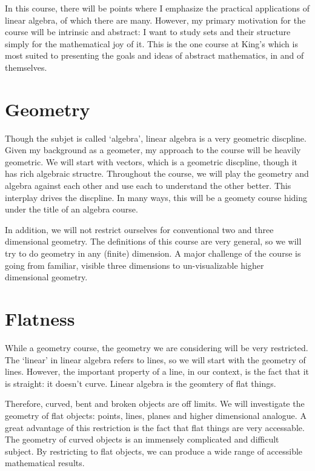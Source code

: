 \documentclass[fleqn]{report}
\begin{document}
In this course, there will be points where I emphasize the
practical applications of linear algebra, of which there are
many. However, my primary motivation for the course will be
intrinsic and abstract: I want to study sets and their
structure simply for the mathematical joy of it. This is the
one course at King's which is most suited to presenting the
goals and ideas of abstract mathematics, in and of themselves. 

\section{Geometry}

Though the subjet is called `algebra', linear algebra is a
very geometric discpline. Given my background as a geometer,
my approach to the course will be heavily geometric. We
will start with vectors, which is a geometric discpline,
though it has rich algebraic structre. Throughout the course,
we will play the geometry and algebra against each other and
use each to understand the other better. This interplay drives
the discpline. In many ways, this will be a geomety course
hiding under the title of an algebra course.

In addition, we will not restrict ourselves for conventional
two and three dimensional geometry. The definitions of this
course are very general, so we will try to do geometry in any
(finite) dimension. A major challenge of the course is going
from familiar, visible three dimensions to un-visualizable
higher dimensional geometry.

\section{Flatness}

While a geometry course, the geometry we are considering will
be very restricted. The `linear' in linear algebra refers to
lines, so we will start with the geometry of lines. However,
the important property of a line, in our context, is the fact
that it is straight: it doesn't curve. Linear algebra is the
geomtery of flat things.

Therefore, curved, bent and broken objects are off limits. We
will investigate the geometry of flat objects: points, lines,
planes and higher dimensional analogue. A great advantage of
this restriction is the fact that flat things are very
accessable. The geometry of curved objects is an immensely
complicated and difficult subject. By restricting to flat
objects, we can produce a wide range of accessible
mathematical results. 
\end{document}
